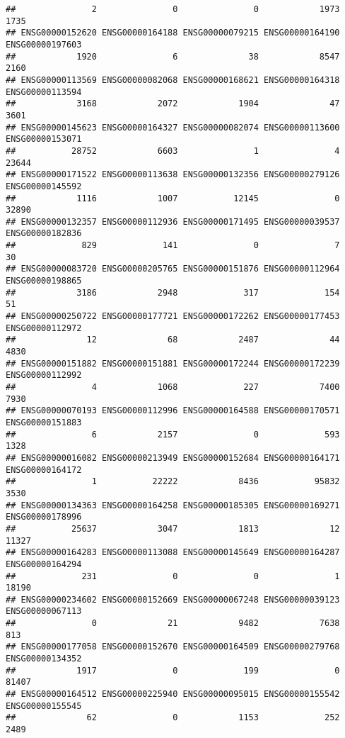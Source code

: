 \documentclass[
]{article}
\begin{document}
\begin{verbatim}
##               2               0               0            1973            1735 
## ENSG00000152620 ENSG00000164188 ENSG00000079215 ENSG00000164190 ENSG00000197603 
##            1920               6              38            8547            2160 
## ENSG00000113569 ENSG00000082068 ENSG00000168621 ENSG00000164318 ENSG00000113594 
##            3168            2072            1904              47            3601 
## ENSG00000145623 ENSG00000164327 ENSG00000082074 ENSG00000113600 ENSG00000153071 
##           28752            6603               1               4           23644 
## ENSG00000171522 ENSG00000113638 ENSG00000132356 ENSG00000279126 ENSG00000145592 
##            1116            1007           12145               0           32890 
## ENSG00000132357 ENSG00000112936 ENSG00000171495 ENSG00000039537 ENSG00000182836 
##             829             141               0               7              30 
## ENSG00000083720 ENSG00000205765 ENSG00000151876 ENSG00000112964 ENSG00000198865 
##            3186            2948             317             154              51 
## ENSG00000250722 ENSG00000177721 ENSG00000172262 ENSG00000177453 ENSG00000112972 
##              12              68            2487              44            4830 
## ENSG00000151882 ENSG00000151881 ENSG00000172244 ENSG00000172239 ENSG00000112992 
##               4            1068             227            7400            7930 
## ENSG00000070193 ENSG00000112996 ENSG00000164588 ENSG00000170571 ENSG00000151883 
##               6            2157               0             593            1328 
## ENSG00000016082 ENSG00000213949 ENSG00000152684 ENSG00000164171 ENSG00000164172 
##               1           22222            8436           95832            3530 
## ENSG00000134363 ENSG00000164258 ENSG00000185305 ENSG00000169271 ENSG00000178996 
##           25637            3047            1813              12           11327 
## ENSG00000164283 ENSG00000113088 ENSG00000145649 ENSG00000164287 ENSG00000164294 
##             231               0               0               1           18190 
## ENSG00000234602 ENSG00000152669 ENSG00000067248 ENSG00000039123 ENSG00000067113 
##               0              21            9482            7638             813 
## ENSG00000177058 ENSG00000152670 ENSG00000164509 ENSG00000279768 ENSG00000134352 
##            1917               0             199               0           81407 
## ENSG00000164512 ENSG00000225940 ENSG00000095015 ENSG00000155542 ENSG00000155545 
##              62               0            1153             252            2489 

\end{verbatim}
\end{document}
